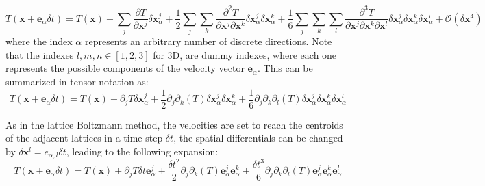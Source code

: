 \documentclass{article}
\newcommand{\locx}{\mathbf{x}}
\newcommand{\vele}{\mathbf{e}_\alpha}
\begin{document}
	\begin{equation*}
	T (\mathbf{x}+\mathbf{e}_\alpha \delta t)  = T(\mathbf{x}) + \sum_{j} \frac{\partial T}{\partial \mathbf{x}^j} \delta \mathbf{x}_\alpha^j + \frac{1}{2} \sum_{j} \sum_{k} \frac{\partial^2 T}{\partial \mathbf{x}^j \partial \mathbf{x}^k} \delta \mathbf{x}_\alpha^j \delta \mathbf{x}_\alpha^k + \frac{1}{6} \sum_{j} \sum_{k} \sum_{l} \frac{\partial^3 T}{\partial \mathbf{x}^j \partial \mathbf{x}^k \partial \mathbf{x}^l} \delta \mathbf{x}_\alpha^j \delta \mathbf{x}_\alpha^k \delta \mathbf{x}_\alpha^l + \mathcal{O}(\delta \mathbf{x}^4)
	\end{equation*}
	where the index $\alpha$ represents an arbitrary number of discrete directions. Note that the indexes $l,m,n \in [1,2,3]$ for 3D, are dummy indexes, where each one represents the possible components of the velocity vector $\vele$. This can be summarized in tensor notation as:
	\begin{equation*}
	T (\mathbf{x}+\mathbf{e}_\alpha \delta t)  = T(\mathbf{x}) + \partial_j T \delta \mathbf{x}_\alpha^j + \frac{1}{2} \partial_j \partial_k (T) \delta \mathbf{x}_\alpha^j \delta \mathbf{x}_\alpha^k + \frac{1}{6} \partial_j \partial_k \partial_l (T)  \delta \mathbf{x}_\alpha^j \delta \mathbf{x}_\alpha^k \delta \mathbf{x}_\alpha^l
	\end{equation*}
	
	As in the lattice Boltzmann method, the velocities are set to reach the centroids of the adjacent lattices in a time step $\delta t$, the spatial differentials can be changed by $\delta \locx^l = e_{\alpha,l} \delta t$, leading to the following expansion:
	\begin{equation*}
	T (\mathbf{x}+\mathbf{e}_\alpha \delta t)  = T(\mathbf{x}) + \partial_j T \delta t \vele^j + \frac{\delta t^2}{2} \partial_j \partial_k (T) \vele^j \vele^k + \frac{\delta t^3}{6} \partial_j \partial_k \partial_l (T)  \vele^j \vele^k \vele^l
	\end{equation*}
	
\end{document}
